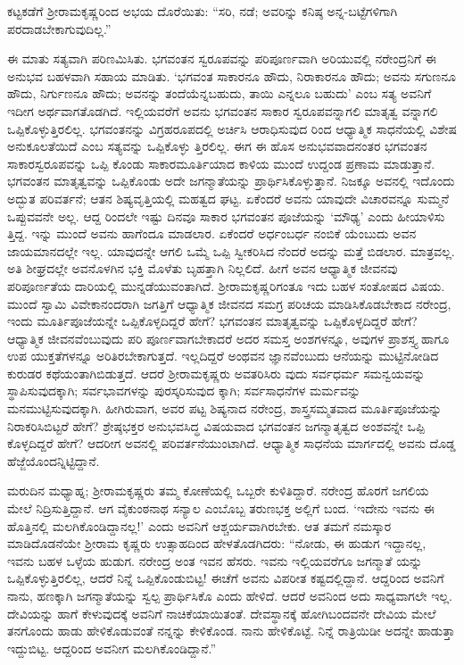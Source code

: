 ಕಟ್ಟಕಡೆಗೆ ಶ್ರೀರಾಮಕೃಷ್ಣರಿಂದ ಅಭಯ ದೊರೆಯಿತು: “ಸರಿ, ನಡೆ; ಅವರಿನ್ನು ಕನಿಷ್ಠ ಅನ್ನ-ಬಟ್ಟೆಗಳಿಗಾಗಿ ಪರದಾಡಬೇಕಾಗುವುದಿಲ್ಲ.”

ಈ ಮಾತು ಸತ್ಯವಾಗಿ ಪರಿಣಮಿಸಿತು. ಭಗವಂತನ ಸ್ವರೂಪವನ್ನು ಪರಿಪೂರ್ಣವಾಗಿ ಅರಿಯುವಲ್ಲಿ ನರೇಂದ್ರನಿಗೆ ಈ ಅನುಭವ ಬಹಳವಾಗಿ ಸಹಾಯ ಮಾಡಿತು. ‘ಭಗವಂತ ಸಾಕಾರನೂ ಹೌದು, ನಿರಾಕಾರನೂ ಹೌದು; ಅವನು ಸಗುಣನೂ ಹೌದು, ನಿರ್ಗುಣನೂ ಹೌದು; ಅವನನ್ನು ತಂದೆಯೆನ್ನಬಹುದು, ತಾಯಿ ಎನ್ನಲೂ ಬಹುದು’ ಎಂಬ ಸತ್ಯ ಅವನಿಗೆ ಇದೀಗ ಅರ್ಥವಾಗತೊಡಗಿದೆ. ಇಲ್ಲಿಯವರೆಗೆ ಅವನು ಭಗವಂತನ ಸಾಕಾರ ಸ್ವರೂಪವನ್ನಾಗಲಿ ಮಾತೃತ್ವ ವನ್ನಾಗಲಿ ಒಪ್ಪಿಕೊಳ್ಳುತ್ತಿರಲಿಲ್ಲ. ಭಗವಂತನನ್ನು ವಿಗ್ರಹರೂಪದಲ್ಲಿ ಅರ್ಚಿಸಿ ಆರಾಧಿಸುವುದ ರಿಂದ ಆಧ್ಯಾತ್ಮಿಕ ಸಾಧನೆಯಲ್ಲಿ ವಿಶೇಷ ಅನುಕೂಲತೆಯಿದೆ ಎಂಬ ಸತ್ಯವನ್ನು ಒಪ್ಪಿಕೊಳ್ಳು ತ್ತಿರಲಿಲ್ಲ. ಈಗ ಈ ಹೊಸ ಅನುಭವವಾದನಂತರ ಭಗವಂತನ ಸಾಕಾರಸ್ವರೂಪವನ್ನು ಒಪ್ಪಿ ಕೊಂಡು ಸಾಕಾರಮೂರ್ತಿಯಾದ ಕಾಳಿಯ ಮುಂದೆ ಉದ್ದಂಡ ಪ್ರಣಾಮ ಮಾಡುತ್ತಾನೆ. ಭಗವಂತನ ಮಾತೃತ್ವವನ್ನು ಒಪ್ಪಿಕೊಂಡು ಅದೇ ಜಗನ್ಮಾತೆಯನ್ನು ಪ್ರಾರ್ಥಿಸಿಕೊಳ್ಳುತ್ತಾನೆ. ನಿಜಕ್ಕೂ ಅವನಲ್ಲಿ ಇದೊಂದು ಅದ್ಭುತ ಪರಿವರ್ತನೆ; ಆತನ ಶಿಷ್ಯವೃತ್ತಿಯಲ್ಲಿ ಮಹತ್ವದ ಘಟ್ಟ. ಏಕೆಂದರೆ ಅವನು ಯಾವುದೇ ವಿಚಾರವನ್ನೂ ಸುಮ್ಮನೆ ಒಪ್ಪುವವನೇ ಅಲ್ಲ. ಆದ್ದ ರಿಂದಲೇ ಇಷ್ಟು ದಿನವೂ ಸಾಕಾರ ಭಗವಂತನ ಪೂಜೆಯನ್ನು ‘ಮೌಢ್ಯ’ ಎಂದು ಹೀಯಾಳಿಸು ತ್ತಿದ್ದ. ಇನ್ನು ಮುಂದೆ ಅವನು ಹಾಗೆಂದೂ ಮಾಡಲಾರ. ಏಕೆಂದರೆ ಅರ್ಧಂಬರ್ಧ ನಂಬಿಕೆ ಯೆಂಬುದು ಅವನ ಜಾಯಮಾನದಲ್ಲೇ ಇಲ್ಲ. ಯಾವುದನ್ನೇ ಆಗಲಿ ಒಮ್ಮೆ ಒಪ್ಪಿ ಸ್ವೀಕರಿಸಿದ ನೆಂದರೆ ಅದನ್ನು ಮತ್ತೆ ಬಿಡಲಾರ. ಮಾತ್ರವಲ್ಲ. ಅತಿ ಶೀಘ್ರದಲ್ಲೇ ಅವನೊಳಗಿನ ಭಕ್ತಿ ಮೊಳೆತು ಬೃಹತ್ತಾಗಿ ನಿಲ್ಲಲಿದೆ. ಹೀಗೆ ಅವನ ಆಧ್ಯಾತ್ಮಿಕ ಜೀವನವು ಪರಿಪೂರ್ಣತೆಯ ದಾರಿಯಲ್ಲಿ ಮುನ್ನಡೆಯುವಂತಾಗಿದೆ. ಶ್ರೀರಾಮಕೃಷ್ಣರಿಗಂತೂ ಇದು ಬಹಳ ಸಂತೋಷದ ವಿಷಯ. ಮುಂದೆ ಸ್ವಾಮಿ ವಿವೇಕಾನಂದರಾಗಿ ಜಗತ್ತಿಗೆ ಆಧ್ಯಾತ್ಮಿಕ ಜೀವನದ ಸಮಗ್ರ ಪರಿಚಯ ಮಾಡಿಸಿಕೊಡಬೇಕಾದ ನರೇಂದ್ರ, ಇಂದು ಮೂರ್ತಿಪೂಜೆಯನ್ನೇ ಒಪ್ಪಿಕೊಳ್ಳದಿದ್ದರೆ ಹೇಗೆ? ಭಗವಂತನ ಮಾತೃತ್ವವನ್ನು ಒಪ್ಪಿಕೊಳ್ಳದಿದ್ದರೆ ಹೇಗೆ? ಆಧ್ಯಾತ್ಮಿಕ ಜೀವನವೆಂಬುವುದು ಪರಿ ಪೂರ್ಣವಾಗಬೇಕಾದರೆ ಅದರ ಸಮಸ್ತ ಅಂಶಗಳನ್ನೂ, ಅವುಗಳ ಪ್ರಾಶಸ್ತ್ಯ ಹಾಗೂ ಉಪ ಯುಕ್ತತೆಗಳನ್ನೂ ಅರಿತಿರಬೇಕಾಗುತ್ತದೆ. ಇಲ್ಲದಿದ್ದರೆ ಅಂಥವನ ಜ್ಞಾನವೆಂಬುದು ಆನೆಯನ್ನು ಮುಟ್ಟಿನೋಡಿದ ಕುರುಡರ ಕಥೆಯಂತಾಗಿಬಿಡುತ್ತದೆ. ಆದರೆ ಶ್ರೀರಾಮಕೃಷ್ಣರು ಅವತರಿಸಿರು ವುದು ಸರ್ವಧರ್ಮ ಸಮನ್ವಯವನ್ನು ಸ್ಥಾಪಿಸುವುದಕ್ಕಾಗಿ; ಸರ್ವಭಾವಗಳನ್ನು ಪುರಸ್ಕರಿಸುವುದ ಕ್ಕಾಗಿ; ಸರ್ವಸಾಧನೆಗಳ ಮರ್ಮವನ್ನು ಮನಮುಟ್ಟಿಸುವುದಕ್ಕಾಗಿ. ಹೀಗಿರುವಾಗ, ಅವರ ಪಟ್ಟ ಶಿಷ್ಯನಾದ ನರೇಂದ್ರ, ಶಾಸ್ತ್ರಸಮ್ಮತವಾದ ಮೂರ್ತಿಪೂಜೆಯನ್ನು ನಿರಾಕರಿಸಿಬಿಟ್ಟರೆ ಹೇಗೆ? ಶ್ರೇಷ್ಠಭಕ್ತರ ಅನುಭವಸಿದ್ಧ ವಿಷಯವಾದ ಭಗವಂತನ ಜಗನ್ಮಾತೃತ್ವದ ಅಂಶವನ್ನೇ ಒಪ್ಪಿ ಕೊಳ್ಳದಿದ್ದರೆ ಹೇಗೆ? ಆದರೀಗ ಅವನಲ್ಲಿ ಪರಿವರ್ತನೆಯುಂಟಾಗಿದೆ. ಆಧ್ಯಾತ್ಮಿಕ ಸಾಧನೆಯ ಮಾರ್ಗದಲ್ಲಿ ಅವನು ದೊಡ್ಡ ಹೆಜ್ಜೆಯೊಂದನ್ನಿಟ್ಟಿದ್ದಾನೆ.

ಮರುದಿನ ಮಧ್ಯಾಹ್ನ; ಶ್ರೀರಾಮಕೃಷ್ಣರು ತಮ್ಮ ಕೋಣೆಯಲ್ಲಿ ಒಬ್ಬರೇ ಕುಳಿತಿದ್ದಾರೆ. ನರೇಂದ್ರ ಹೊರಗೆ ಜಗಲಿಯ ಮೇಲೆ ನಿದ್ರಿಸುತ್ತಿದ್ದಾನೆ. ಆಗ ವೈಕುಂಠನಾಥ ಸನ್ಯಾಲ ಎಂಬೊಬ್ಬ ತರುಣಭಕ್ತ ಅಲ್ಲಿಗೆ ಬಂದ. ‘ಇದೇನು ಇವನು ಈ ಹೊತ್ತಿನಲ್ಲಿ ಮಲಗಿಕೊಂಡಿದ್ದಾನಲ್ಲ!’ ಎಂದು ಅವನಿಗೆ ಆಶ್ಚರ್ಯವಾಗಿರಬೇಕು. ಆತ ತಮಗೆ ನಮಸ್ಕಾರ ಮಾಡಿದೊಡನೆಯೇ ಶ್ರೀರಾಮ ಕೃಷ್ಣರು ಉತ್ಸಾಹದಿಂದ ಹೇಳತೊಡಗಿದರು: “ನೋಡು, ಈ ಹುಡುಗ ಇದ್ದಾನಲ್ಲ, ಇವನು ಬಹಳ ಒಳ್ಳೆಯ ಹುಡುಗ. ನರೇಂದ್ರ ಅಂತ ಇವನ ಹೆಸರು. ಇವನು ಇಲ್ಲಿಯವರೆಗೂ ಜಗನ್ಮಾತೆ ಯನ್ನು ಒಪ್ಪಿಕೊಳ್ಳುತ್ತಿರಲಿಲ್ಲ, ಆದರೆ ನಿನ್ನೆ ಒಪ್ಪಿಕೊಂಡುಬಿಟ್ಟ! ಈಚೆಗೆ ಅವನು ವಿಪರೀತ ಕಷ್ಟದಲ್ಲಿದ್ದಾನೆ. ಆದ್ದರಿಂದ ಅವನಿಗೆ ನಾನು, ಹಣಕ್ಕಾಗಿ ಜಗನ್ಮಾತೆಯನ್ನು ಸ್ವಲ್ಪ ಪ್ರಾರ್ಥಿಸಿಕೊ ಎಂದು ಹೇಳಿದೆ. ಆದರೆ ಅವನಿಂದ ಅದು ಸಾಧ್ಯವಾಗಲೇ ಇಲ್ಲ. ದೇವಿಯನ್ನು ಹಾಗೆ ಕೇಳುವುದಕ್ಕೆ ಅವನಿಗೆ ನಾಚಿಕೆಯಾಯಿತಂತೆ. ದೇವಸ್ಥಾನಕ್ಕೆ ಹೋಗಿಬಂದವನೇ ದೇವಿಯ ಮೇಲೆ ತನಗೊಂದು ಹಾಡು ಹೇಳಿಕೊಡುವಂತೆ ನನ್ನನ್ನು ಕೇಳಿಕೊಂಡ. ನಾನು ಹೇಳಿಕೊಟ್ಟೆ. ನಿನ್ನೆ ರಾತ್ರಿಯಿಡೀ ಅದನ್ನೇ ಹಾಡುತ್ತಾ ಇದ್ದುಬಿಟ್ಟ. ಆದ್ದರಿಂದ ಅವನೀಗ ಮಲಗಿಕೊಂಡಿದ್ದಾನೆ.”

